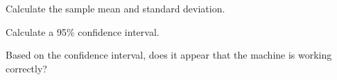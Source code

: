 \item  Calculate the sample mean and standard deviation. 
\item  Calculate a 95\% confidence interval.  
\item  Based on the confidence interval, does it appear that the machine is working correctly?













